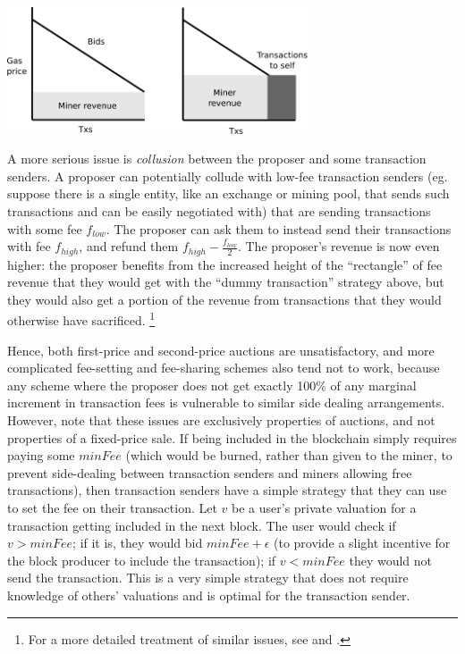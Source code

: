 \documentclass[12pt, final]{article}
\begin{document}
\begin{center}
\includegraphics[width=3.5in]{kth_price_revenue.png} \\
\end{center}

A more serious issue is \emph{collusion} between the proposer and some transaction senders. A proposer can potentially collude with low-fee transaction senders (eg. suppose there is a single entity, like an exchange or mining pool, that sends such transactions and can be easily negotiated with) that are sending transactions with some fee $f_{low}$. The proposer can ask them to instead send their transactions with fee $f_{high}$, and refund them $f_{high} - \frac{f_{low}}{2}$. The proposer's revenue is now even higher: the proposer benefits from the increased height of the ``rectangle'' of fee revenue that they would get with the ``dummy transaction'' strategy above, but they would also get a portion of the revenue from transactions that they would otherwise have sacrificed. \footnote{For a more detailed treatment of similar issues, see \cite{li2018} and \cite{rothkopf2007}.}

Hence, both first-price and second-price auctions are unsatisfactory, and more complicated fee-setting and fee-sharing schemes also tend not to work, because any scheme where the proposer does not get exactly 100\% of any marginal increment in transaction fees is vulnerable to similar side dealing arrangements. However, note that these issues are exclusively properties of auctions, and not properties of a fixed-price sale. If being included in the blockchain simply requires paying some $minFee$ (which would be burned, rather than given to the miner, to prevent side-dealing between transaction senders and miners allowing free transactions), then transaction senders have a simple strategy that they can use to set the fee on their transaction. Let $v$ be a user's private valuation for a transaction getting included in the next block. The user would check if $v > minFee$; if it is, they would bid $minFee + \epsilon$ (to provide a slight incentive for the block producer to include the transaction); if $v < minFee$ they would not send the transaction. This is a very simple strategy that does not require knowledge of others' valuations and is optimal for the transaction sender.
\end{document}
